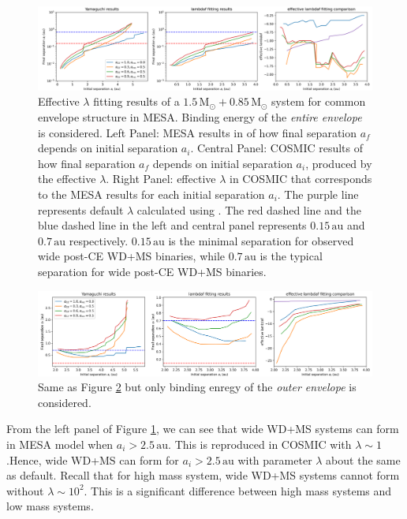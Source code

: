 \documentclass[12pt]{article}
\newcommand{\Msun}{\,\mathrm{M_{\odot}}}
\newcommand{\au}{\, \mathrm{au}}
\begin{document}
\begin{figure}
  \centering
  \includegraphics[width=\linewidth]{fig/1.5+0.8cmp_whole.png}
  \caption{Effective $\lambda$ fitting results of a $1.5\Msun + 0.85\Msun$ system for common envelope structure in MESA. Binding energy of the \emph{entire envelope} is considered. Left Panel: MESA results in \cite{yamaguchi_lo} of how final separation $a_f$ depends on initial separation $a_i$. Central Panel: COSMIC results of how final separation $a_f$ depends on initial separation $a_i$, produced by the effective $\lambda$. Right Panel: effective $\lambda$ in COSMIC that corresponds to the MESA results for each initial separation $a_i$. The purple line represents default $\lambda$ calculated using \cite{claeys2014theoretical}. The red dashed line and the blue dashed line in the left and central panel represents $0.15 \au$ and $0.7 \au$ respectively. $0.15 \au$ is the minimal separation for observed wide post-CE WD+MS binaries, while $0.7 \au$ is the typical separation for wide post-CE WD+MS binaries.}
  \label{fit_cmp_lo_whole}
\end{figure}

\begin{figure}
  \centering
  \includegraphics[width=\linewidth]{fig/1.5+0.8cmp_pt.png}
  \caption{Same as Figure \ref{fit_cmp_lo_pt} but only binding enregy of the \emph{outer envelope} is considered.}
  \label{fit_cmp_lo_pt}
\end{figure}

From the left panel of Figure \ref{fit_cmp_lo_whole}, we can see that wide WD+MS systems can form in MESA model when $a_i > 2.5 \au$. This is reproduced in COSMIC with $\lambda \sim 1$.Hence, wide WD+MS can form for $a_i > 2.5 \au$ with parameter $\lambda$ about the same as default. Recall that for high mass system, wide WD+MS systems cannot form without $\lambda \sim 10^2$. This is a significant difference between high mass systems and low mass systems.
\end{document}
